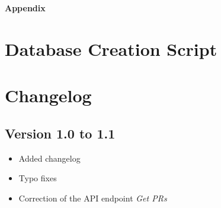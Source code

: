 \documentclass[a4paper, 11pt, oneside, openright, english]{book}
\begin{document}


\tableofcontents






\appendix
\newpage
\thispagestyle{empty}
\vspace*{\fill}
\begin{center}
    \Huge\textbf{Appendix}
\end{center}
\vspace*{\fill}
\newpage

\chapter{Database Creation Script}


\chapter{Changelog}
\section{Version 1.0 to 1.1}
\begin{itemize}
    \item Added changelog
    \item Typo fixes
    \item Correction of the API endpoint \textit{Get PRs}
\end{itemize}
\end{document}
